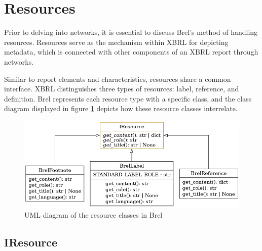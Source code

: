 \section{Resources}
\label{sec:api_resources}

Prior to delving into networks, it is essential to discuss Brel's method of handling resources.
Resources serve as the mechanism within XBRL for depicting metadata,
which is connected with other components of an XBRL report through networks.

Similar to report elements and characteristics, resources share a common interface.
XBRL distinguishes three types of resources: label, reference, and definition.
Brel represents each resource type with a specific class,
and the class diagram displayed in figure \ref{fig:brel_resource_classes} depicts how these resource classes interrelate.

\begin{figure}[H]
    \centering
    \includegraphics[width=\textwidth]{images/brel_resource_classes.png}
    \caption{UML diagram of the resource classes in Brel}
    \label{fig:brel_resource_classes}
\end{figure}

\subsection{IResource}

